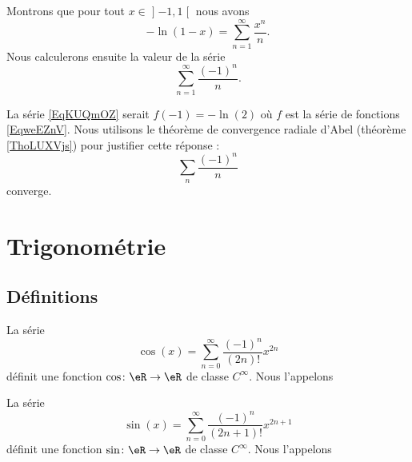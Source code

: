 \begin{example}     \label{EXooKNTPooKiRExX}
    Montrons que pour tout \( x\in\mathopen] -1 , 1 \mathclose[\) nous avons
    \begin{equation}        \label{EqweEZnV}
        -\ln(1-x)=\sum_{n=1}^{\infty}\frac{ x^n }{ n }.
    \end{equation}
    Nous calculerons ensuite la valeur de la série
    \begin{equation}    \label{EqKUQmOZ}
        \sum_{n=1}^{\infty}\frac{ (-1)^n }{ n }.
    \end{equation}

    La série \eqref{EqKUQmOZ} serait \( f(-1)=-\ln(2)\) où \( f\) est la série de fonctions \eqref{EqweEZnV}. Nous utilisons le théorème de convergence radiale d'Abel (théorème \ref{ThoLUXVjs}) pour justifier cette réponse :
    \begin{equation}
        \sum_n\frac{ (-1)^n }{ n }
    \end{equation}
    converge.
\end{example}

\section{Trigonométrie}

\subsection{Définitions}

\begin{propositionDef}
    La série
    \begin{equation}
        \cos(x)=\sum_{n=0}^{\infty}\frac{ (-1)^n }{ (2n)! }x^{2n}
    \end{equation}
    définit une fonction \( \cos\colon \eR\to \eR\) de classe \(  C^{\infty}\). Nous l'appelons 

    La série
    \begin{equation}
        \sin(x)=\sum_{n=0}^{\infty}\frac{ (-1)^n }{ (2n+1)! }x^{2n+1}
    \end{equation}
    définit une fonction \( \sin\colon \eR\to \eR\) de classe \(  C^{\infty}\). Nous l'appelons 
\end{propositionDef}

